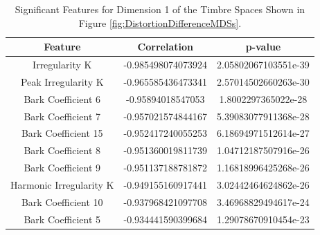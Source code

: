 	\begin{table}[h!]
		\centering
		\begin{tabular}{|c|c|c|}
			\hline
			\bf{Feature} & \bf{Correlation} & \bf{p-value} \\
			\hline
			\hline
			Irregularity K & -0.985498074073924 & 2.05802067103551e-39 \\
			\hline
			Peak Irregularity K & -0.965585436473341 & 2.57014502660263e-30 \\
			\hline
			Bark Coefficient 6 & -0.95894018547053 & 1.8002297365022e-28 \\
			\hline
			Bark Coefficient 7 & -0.957021574844167 & 5.39083077911368e-28 \\
			\hline
			Bark Coefficient 15 & -0.952417240055253 & 6.18694971512614e-27 \\
			\hline
			Bark Coefficient 8 & -0.951360019811739 & 1.04712187507916e-26 \\
			\hline
			Bark Coefficient 9 & -0.951137188781872 & 1.16818996425268e-26 \\
			\hline
			Harmonic Irregularity K & -0.949155160917441 & 3.02442464624862e-26 \\
			\hline
			Bark Coefficient 10 & -0.937968421097708 & 3.46968829494617e-24 \\
			\hline
			Bark Coefficient 5 & -0.934441590399684 & 1.29078670910454e-23 \\
			\hline
		\end{tabular}
		\caption{Significant Features for Dimension 1 of the Timbre Spaces Shown in Figure 
			 \ref{fig:DistortionDifferenceMDSs}.}
		\label{tab:DistortionDifferenceFeatures}
	\end{table}


